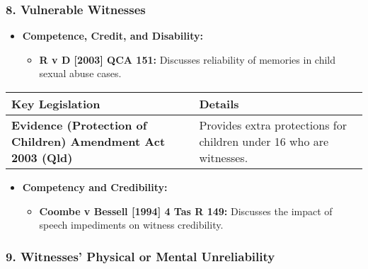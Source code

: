 \subsubsection{\texorpdfstring{8. \textbf{Vulnerable
Witnesses}}{8. Vulnerable Witnesses}}\label{vulnerable-witnesses}

\begin{itemize}
\tightlist
\item
  \textbf{Competence, Credit, and Disability:}

  \begin{itemize}
  \tightlist
  \item
    \textbf{R v D {[}2003{]} QCA 151:} Discusses reliability of memories
    in child sexual abuse cases.
  \end{itemize}
\end{itemize}

\begin{longtable}[]{@{}
  >{\raggedright\arraybackslash}p{}
  >{\raggedright\arraybackslash}p{}@{}}
\toprule\noalign{}
\begin{minipage}[b]{\linewidth}\raggedright
\textbf{Key Legislation}
\end{minipage} & \begin{minipage}[b]{\linewidth}\raggedright
\textbf{Details}
\end{minipage} \\
\midrule\noalign{}
\endhead
\bottomrule\noalign{}
\endlastfoot
\textbf{Evidence (Protection of Children) Amendment Act 2003 (Qld)} &
Provides extra protections for children under 16 who are witnesses. \\
\end{longtable}

\begin{itemize}
\tightlist
\item
  \textbf{Competency and Credibility:}

  \begin{itemize}
  \tightlist
  \item
    \textbf{Coombe v Bessell {[}1994{]} 4 Tas R 149:} Discusses the
    impact of speech impediments on witness credibility.
  \end{itemize}
\end{itemize}

\subsubsection{\texorpdfstring{9. \textbf{Witnesses' Physical or Mental
Unreliability}}{9. Witnesses' Physical or Mental Unreliability}}\label{witnesses-physical-or-mental-unreliability}


